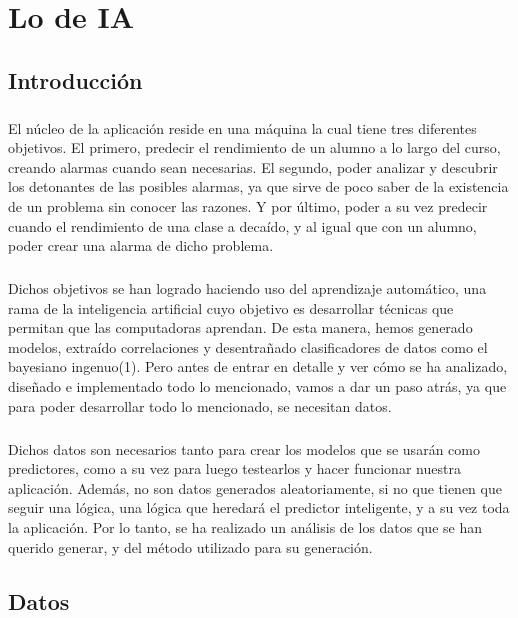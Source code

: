 \chapter{Lo de IA}

\section{Introducción}
\paragraph{}
El núcleo de la aplicación reside en una máquina la cual tiene tres diferentes objetivos. El primero, predecir el rendimiento de un alumno a lo largo del curso, creando alarmas cuando sean necesarias. El segundo, poder analizar y descubrir los detonantes de las posibles alarmas, ya que sirve de poco saber de la existencia de un problema sin conocer las razones. Y por último, poder a su vez predecir cuando el rendimiento de una clase a decaído, y al igual que con un alumno, poder crear una alarma de dicho problema.
\paragraph{}
Dichos objetivos se han logrado haciendo uso del aprendizaje automático, una rama de la inteligencia artificial cuyo objetivo es desarrollar técnicas que permitan que las computadoras aprendan. De esta manera, hemos generado modelos, extraído correlaciones y desentrañado clasificadores de datos como el bayesiano ingenuo(1). Pero antes de entrar en detalle y ver cómo se ha analizado, diseñado e implementado todo lo mencionado, vamos a dar un paso atrás, ya que para poder desarrollar todo lo mencionado, se necesitan datos.
\paragraph{}
Dichos datos son necesarios tanto para crear los modelos que se usarán como predictores, como a su vez para luego testearlos y hacer funcionar nuestra aplicación. Además, no son datos generados aleatoriamente, si no que tienen que seguir una lógica, una lógica que heredará el predictor inteligente, y a su vez toda la aplicación. Por lo tanto, se ha realizado un análisis de los datos que se han querido generar, y del método utilizado para su generación.

\section{Datos}
